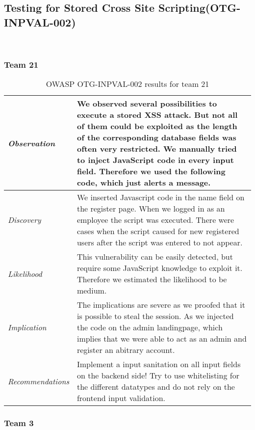 \documentclass[headsepline,footsepline,footinclude=false,oneside,fontsize=11pt,paper=a4,listof=totoc,bibliography=totoc]{scrbook} %
\begin{document}
\pagebreak 
\subsection{Testing for Stored Cross Site Scripting(OTG-INPVAL-002)}\

\subsubsection{Team 21}

\begin{table}[H]
	\centering
	\begin{tabular}{l p{11cm}} 
		\textit{Observation} & We observed several possibilities to execute a stored XSS attack. But not all of
		them could be exploited as the length of the corresponding database fields was
		often very restricted.
		We manually tried to inject JavaScript code in every input field. Therefore we
		used the following code, which just alerts a message. \\ 
		\hline
		\textit{Discovery} &   We inserted Javascript code in the name field on the register page.
		When we logged in as an employee the script was executed.  There were cases when the script caused for new registered users after the script was entered to not appear. \\
		\hline
		\textit{Likelihood} & This vulnerability can be easily detected, but require some JavaScript knowledge to exploit it. Therefore we estimated the likelihood to be medium.\\
		\hline
		\textit{Implication} & The implications are severe as we proofed that it is possible to steal the session. As we injected the code on the admin landingpage, which implies that we were able to act as an admin and register an abitrary account.\\
		\hline
		\textit{Recommendations} &Implement a input sanitation on all input fields on the backend side!  Try to use whitelisting for the different datatypes and do not rely on the frontend input
		validation.\\ 
	\end{tabular}
	\caption{OWASP OTG-INPVAL-002 results for team 21}
	\label{table:scenario2}
\end{table}

\subsubsection{Team 3}
\end{document}
